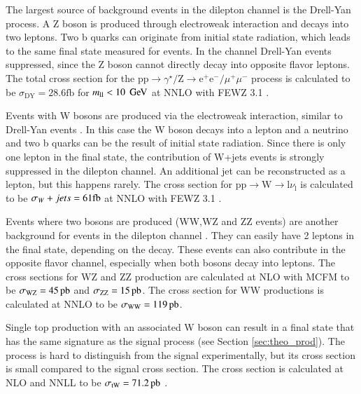 The largest source of background events in the dilepton channel is the  Drell-Yan \cite{CarloniCalame:2007cd} process. A Z boson is produced through electroweak interaction and decays into two leptons. Two b quarks can originate from initial state radiation, which leads to the
same final state measured for \ttbar events. In the \emu channel Drell-Yan events suppressed, since the Z boson cannot directly decay into opposite flavor leptons.
The total cross section for the $\mathrm{pp}\rightarrow\gamma^{\star}/\mathrm{Z}\rightarrow \mathrm{e}^+\mathrm{e}^- / \mu^+ \mu^-$ process is calculated to be $\sigma_{\mathrm{DY}}= 28.6 \si{\femto \barn}$ for 
$m_{\mathrm{ll}} < 10 \; \,\text{Ge\hspace{-.08em}V}$ at NNLO with FEWZ 3.1 \cite{Gavin:2010az}.

Events with W bosons are produced via the electroweak interaction, similar to Drell-Yan events \cite{PhysRevD.86.034021}. In this case the W boson decays into a lepton and a neutrino and two b quarks can be the result of
initial state radiation. Since there is only one lepton in the final state, the contribution of W+jets events is strongly suppressed in the dilepton channel. An additional jet can be reconstructed as a lepton, but this happens rarely.
The cross section for $\mathrm{pp}\rightarrow\mathrm{W}\rightarrow \mathrm{l}\nu_{\mathrm{l}}$ is calculated to be $\sigma_\Wjets=61\si{\femto \barn}$ at NNLO with FEWZ 3.1 \cite{Gavin:2010az}.

Events where two bosons are produced (WW,WZ and ZZ events)\cite{doi:10.1146/annurev-nucl-102010-130106} are another background for \ttbar events in the dilepton channel . They can easily have 2 leptons in the final state, depending on the decay. These events can also contribute in the opposite flavor channel, especially when both bosons decay into leptons.
The cross sections for WZ and ZZ production are calculated at NLO with MCFM \cite{Campbell:1999ah,Campbell:2011bn} to be $\sigma_{\mathrm{WZ}}=45\mbox{\ensuremath{\,\text{pb}}}$ and  $\sigma_{\mathrm{ZZ}}=15\mbox{\ensuremath{\,\text{pb}}}$.
The cross section for WW productions is calculated at NNLO to be $\sigma_{\mathrm{WW}}=119\mbox{\ensuremath{\,\text{pb}}}$\cite{Gehrmann:2014fva}.

Single top production with an associated W boson can result in a final state that has the same signature as the \ttbar signal process (see Section \ref{sec:theo_prod}). The process is hard to distinguish from the \ttbar signal experimentally, but its cross section is small compared to the signal cross section. 
The cross section is calculated at NLO and NNLL to be $\sigma_{\mathrm{tW}}= 71.2\mbox{\ensuremath{\,\text{pb}}}$ \cite{bib:twchan}.




